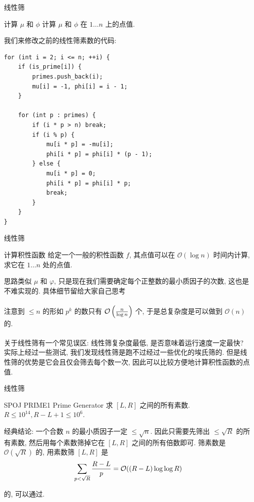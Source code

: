 \documentclass{beamer}
\newcommand{\nl}{\\\hspace*{\fill}\\}
\begin{document}
    \begin{frame}[fragile]{线性筛}
        \begin{block}{计算 $\mu$ 和 $\phi$}
            计算 $\mu$ 和 $\phi$ 在 $1\dots n$ 上的点值.
        \end{block}
        \pause
        我们来修改之前的线性筛素数的代码:
        \begin{lstlisting}
for (int i = 2; i <= n; ++i) {
    if (is_prime[i]) {
        primes.push_back(i);
        mu[i] = -1, phi[i] = i - 1;
    }

    for (int p : primes) {
        if (i * p > n) break;
        if (i % p) {
            mu[i * p] = -mu[i];
            phi[i * p] = phi[i] * (p - 1);
        } else {
            mu[i * p] = 0;
            phi[i * p] = phi[i] * p;
            break;
        }
    }
}\end{lstlisting}
    \end{frame}

    \begin{frame}{线性筛}
        \begin{block}{计算积性函数}
            给定一个一般的积性函数 $f$, 其点值可以在 $\mathcal O(\log n)$ 时间内计算, 求它在 $1\dots n$ 处的点值.
        \end{block}
        \pause
        思路类似 $\mu$ 和 $\varphi$, 只是现在我们需要确定每个正整数的最小质因子的次数, 这也是不难实现的. 具体细节留给大家自己思考\nl
        注意到 $\leq n$ 的形如 $p^k$ 的数只有 $\mathcal O\left(n\over\log n\right)$ 个, 于是总复杂度是可以做到 $\mathcal O(n)$ 的.\nl
        关于线性筛有一个常见误区: 线性筛复杂度最低, 是否意味着运行速度一定最快? 实际上经过一些测试, 我们发现线性筛是跑不过经过一些优化的埃氏筛的. 但是线性筛的优势是它会且仅会筛去每个数一次, 因此可以比较方便地计算积性函数的点值.
    \end{frame}

    \begin{frame}{线性筛}
        \begin{block}{SPOJ PRIME1 Prime Generator}
            求 $[L,R]$ 之间的所有素数. $R\leq 10^{14},R-L+1\leq 10^6$.
        \end{block}
        \pause
        经典结论: 一个合数 $n$ 的最小质因子一定 $\leq\sqrt n$. 因此只需要先筛出 $\leq\sqrt R$ 的所有素数, 然后用每个素数筛掉它在 $[L,R]$ 之间的所有倍数即可. 筛素数是 $\mathcal O(\sqrt R)$ 的, 用素数筛 $[L,R]$ 是
        $$
        \sum_{p<\sqrt R}{R-L\over p}=\mathcal O((R-L)\log\log R)
        $$

        的, 可以通过.
    \end{frame}
\end{document}
